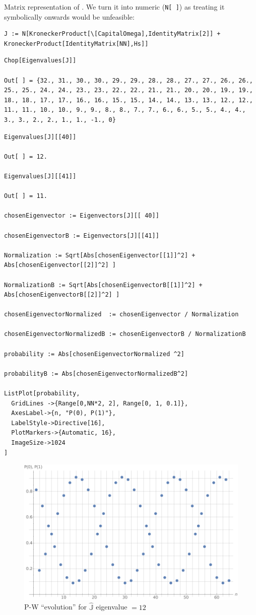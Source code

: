 Matrix representation of \cite[Eq. 1]{Lloyd:Time}.
We turn it into numeric (\verb!N[ ]!) as treating  it symbolically onwards would be unfeasible:
\begin{Verbatim}
J := N[KroneckerProduct[\[CapitalOmega],IdentityMatrix[2]] + KroneckerProduct[IdentityMatrix[NN],Hs]]
\end{Verbatim}
\begin{Verbatim}
Chop[Eigenvalues[J]]

Out[ ] = {32., 31., 30., 30., 29., 29., 28., 28., 27., 27., 26., 26., 25., 25., 24., 24., 23., 23., 22., 22., 21., 21., 20., 20., 19., 19., 18., 18., 17., 17., 16., 16., 15., 15., 14., 14., 13., 13., 12., 12., 11., 11., 10., 10., 9., 9., 8., 8., 7., 7., 6., 6., 5., 5., 4., 4., 3., 3., 2., 2., 1., 1., -1., 0}
\end{Verbatim}
\begin{Verbatim}
Eigenvalues[J][[40]]

Out[ ] = 12.

Eigenvalues[J][[41]]

Out[ ] = 11.

chosenEigenvector := Eigenvectors[J][[ 40]]

chosenEigenvectorB := Eigenvectors[J][[41]]

Normalization := Sqrt[Abs[chosenEigenvector[[1]]^2] + Abs[chosenEigenvector[[2]]^2] ]

NormalizationB := Sqrt[Abs[chosenEigenvectorB[[1]]^2] + Abs[chosenEigenvectorB[[2]]^2] ]

chosenEigenvectorNormalized  := chosenEigenvector / Normalization

chosenEigenvectorNormalizedB := chosenEigenvectorB / NormalizationB  

probability := Abs[chosenEigenvectorNormalized ^2]

probabilityB := Abs[chosenEigenvectorNormalizedB^2]

ListPlot[probability,
  GridLines ->{Range[0,NN*2, 2], Range[0, 1, 0.1]},
  AxesLabel->{n, "P(0), P(1)"},
  LabelStyle->Directive[16],
  PlotMarkers->{Automatic, 16},
  ImageSize->1024
]
\end{Verbatim}
\begin{figure}[!h]
  \centering
  \includegraphics[width=.75\textwidth]{img/N32.png}
  \caption[(from notebook)]{P-W ``evolution'' for $\hat{\mathbb{J}}$ eigenvalue $=12$}
\end{figure}  
